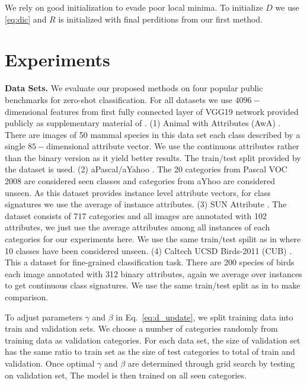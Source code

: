 \documentclass[wcp]{jmlr}
\begin{document}
We rely on good initialization to evade poor local minima.
To initialize $D$ we use
\eqref{eq:dic} and $R$ is initialized with final perditions from our first method.


\section{Experiments}
\textbf{Data Sets.}
We evaluate our proposed methods on four popular public benchmarks for zero-shot classification.
For all datasets we use $4096-$dimensional features from first fully connected layer of VGG19 network \cite{vgg}
provided publicly as supplementary material of \cite{sse}.
(1) Animal with Attributes (AwA) \cite{lampert09}. There are images of 50 mammal species in this data set
each class described by a single $85-$dimensional attribute vector. We use the continuous attributes rather than
the binary version as it yield better results. The train/test split provided by the dataset is used.
(2) aPascal/aYahoo \cite{farhadi09}. The 20 categories from Pascal VOC 2008 \cite{pascal} are considered seen classes and
categories from aYhoo are considered unseen. As this dataset provides instance level attribute vectors,
for class signatures we use the average of instance attributes.
(3) SUN Attribute \cite{sun}. The dataset consists of 717 categories and all images are annotated with 102 attributes, we just
use the average attributes among all instances of each categories for our experiments here. We use the same train/test spilit
as in \cite{jayaraman14} where 10 classes have been considered unseen.
(4) Caltech UCSD Birds-2011 (CUB) \cite{cub}. This a dataset for fine-grained classification task. There are 200 species of
birds each image annotated with 312 binary attributes, again we average over instances to get continuous class signatures.
We use the same train/test split as in \cite{akata13} to make comparison.

To adjust parameters $\gamma$ and $\beta$ in Eq.~\ref{eq:d_update}, we split training data into train and validation sets.
We choose a number of categories randomly from training data as validation categories. For each data set, the size of
validation set has the same ratio to train set as the size of test categories to total of train and validation.
Once optimal $\gamma$ and $\beta$ are determined through grid search by testing on validation set, The model
is then trained on all seen categories.

%
%
\end{document}
